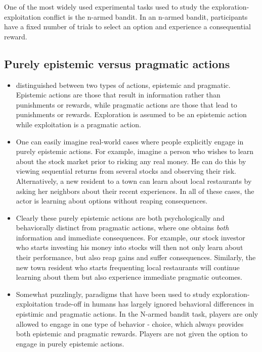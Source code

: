 \documentclass[a4paper,doc,natbib,floatsintext]{apa6}
\begin{document}
One of the most widely used experimental tasks used to study the exploration-exploitation conflict is the n-armed bandit. In an n-armed bandit, participants have a fixed number of trials to select an option and experience a consequential reward.




\subsection{Purely epistemic versus pragmatic actions}

\begin{itemize}

  \item \cite{neth2008thinking} distinguished between two types of actions, epistemic and pragmatic. Epistemic actions are those that result in information rather than punishments or rewards, while pragmatic actions are those that lead to punishments or rewards. Exploration is assumed to be an epistemic action while exploitation is a pragmatic action.
  
  \item One can easily imagine real-world cases where people explicitly engage in purely epistemic actions. For example, imagine a person who wishes to learn about the stock market prior to risking any real money. He can do this by viewing sequential returns from several stocks and observing their risk. Alternatively, a new resident to a town can learn about local restaurants by asking her neighbors about their recent experiences. In all of these cases, the actor is learning about options without reaping consequences.
  
  \item Clearly these purely epistemic actions are both psychologically and behaviorally distinct from pragmatic actions, where one obtains \textit{both} information and immediate consequences. For example, our stock investor who starts investing his money into stocks will then not only learn about their performance, but also reap gains and suffer consequences. Similarly, the new town resident who starts frequenting local restaurants will continue learning about them but also experience immediate pragmatic outcomes.
  
  \item Somewhat puzzlingly, paradigms that have been used to study exploration-exploitation trade-off in humans has largely ignored behavioral differences in epistimic and pragmatic actions. In the N-armed bandit task, players are only allowed to engage in one type of behavior - choice, which always provides both epistemic and pragmatic rewards. Players are not given the option to engage in purely epistemic actions. 
  

\end{itemize}
\end{document}
